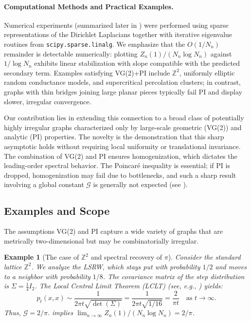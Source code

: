 \documentclass[11pt]{article}
\numberwithin{equation}{section}
\newtheorem{example}[theorem]{Example}
\newcommand{\cG}{\mathcal{G}}
\newcommand{\Z}{\mathbb{Z}}
\begin{document}
\paragraph{Computational Methods and Practical Examples.} Numerical experiments (summarized later in ) were performed using sparse representations of the Dirichlet Laplacians together with iterative eigenvalue routines from \texttt{scipy.sparse.linalg}. We emphasize that the $O(1/N_n)$ remainder is detectable numerically: plotting $Z_n(1)/(N_n \log N_n)$ against $1/\log N_n$ exhibits linear stabilization with slope compatible with the predicted secondary term. Examples satisfying VG(2)+PI include $\Z^2$, uniformly elliptic random conductance models, and supercritical percolation clusters; in contrast, graphs with thin bridges joining large planar pieces typically fail PI and display slower, irregular convergence.

Our contribution lies in extending this connection to a broad class of potentially highly irregular graphs characterized only by large-scale geometric (VG(2)) and analytic (PI) properties. The novelty is the demonstration that this sharp asymptotic holds without requiring local uniformity or translational invariance. The combination of VG(2) and PI ensures homogenization, which dictates the leading-order spectral behavior. The Poincaré inequality is essential; if PI is dropped, homogenization may fail due to bottlenecks, and such a sharp result involving a global constant $\cG$ is generally not expected (see ).

\subsection{Examples and Scope}
The assumptions VG(2) and PI capture a wide variety of graphs that are metrically two-dimensional but may be combinatorially irregular.

\begin{example}[The case of $\mathbb{Z}^2$ and spectral recovery of $\pi$]\label{rem:pi2}
Consider the standard lattice $\mathbb{Z}^2$. We analyze the LSRW, which stays put with probability $1/2$ and moves to a neighbor with probability $1/8$. The covariance matrix of the step distribution is $\Sigma = \frac{1}{4} I_2$. The Local Central Limit Theorem (LCLT) (see, e.g., \cite[Ch. 2]{LawlerLimic10}) yields:
\[
p_t(x,x) \sim \frac{1}{2\pi t \sqrt{\det(\Sigma)}} = \frac{1}{2\pi t \sqrt{1/16}} = \frac{2}{\pi t} \quad \text{as } t \to \infty.
\]
Thus, $\cG = 2/\pi$.  implies $\lim_{n \to \infty} Z_n(1) / (N_n \log N_n) = 2/\pi$.
\end{example}
\end{document}
